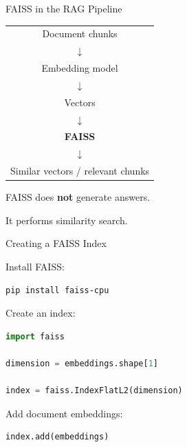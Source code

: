 \documentclass[aspectratio=169]{beamer}
\begin{document}
\begin{frame}{FAISS in the RAG Pipeline}

\begin{center}

\begin{tabular}{c}
Document chunks \\
$\downarrow$ \\
Embedding model \\
$\downarrow$ \\
Vectors \\
$\downarrow$ \\
\textbf{FAISS} \\
$\downarrow$ \\
Similar vectors / relevant chunks
\end{tabular}

\end{center}

FAISS does \textbf{not} generate answers.

It performs similarity search.

\end{frame}

\begin{frame}[fragile]{Creating a FAISS Index}

Install FAISS:

\begin{lstlisting}[language=bash]
pip install faiss-cpu
\end{lstlisting}

Create an index:

\begin{lstlisting}[language=Python]
import faiss

dimension = embeddings.shape[1]

index = faiss.IndexFlatL2(dimension)
\end{lstlisting}

Add document embeddings:

\begin{lstlisting}[language=Python]
index.add(embeddings)
\end{lstlisting}

\end{frame}
\end{document}
